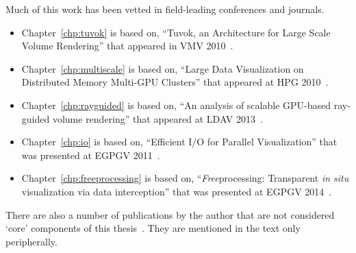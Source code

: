 Much of this work has been vetted in field-leading conferences and
journals.
\begin{itemize}

  \item Chapter~\ref{chp:tuvok} is based on, ``Tuvok, an
  Architecture for Large Scale Volume Rendering'' that appeared in VMV
  2010~\cite{Fogal:2010:Tuvok}.

  \item Chapter~\ref{chp:multiscale} is based on, ``Large Data
  Visualization on Distributed Memory Multi-GPU Clusters'' that
  appeared at HPG 2010~\cite{Fogal:2010:HPG}.

	\item Chapter~\ref{chp:rayguided} is based on, ``An analysis of scalable
	GPU-based ray-guided volume rendering'' that appeared at LDAV
	2013~\cite{Fogal:2013:Analysis}.

  \item Chapter~\ref{chp:io} is based on, ``Efficient I/O
  for Parallel Visualization'' that was presented at EGPGV
  2011~\cite{Fogal:2011:PracticalIO}.

	\item Chapter~\ref{chp:freeprocessing} is based on,
	``\textit{Free}processing: Transparent \textit{in situ} visualization via
	data interception'' that was presented at EGPGV
	2014~\cite{Fogal:2014:Freeprocessing}.

\end{itemize}

There are also a number of publications by the author that are not
considered
`core' components of this thesis~\cite{Fogal:2009:SizeMatters,
Fogal:2010:Bridge, Jevremovic:2011:Education, Jovana:2012:Interactive,
Brownlee:2012:GLuRay, Childs:2012:VisIt, Hermilo:2013:Steering,
Butson:2013:DBS}.  They are mentioned in the text only peripherally.
